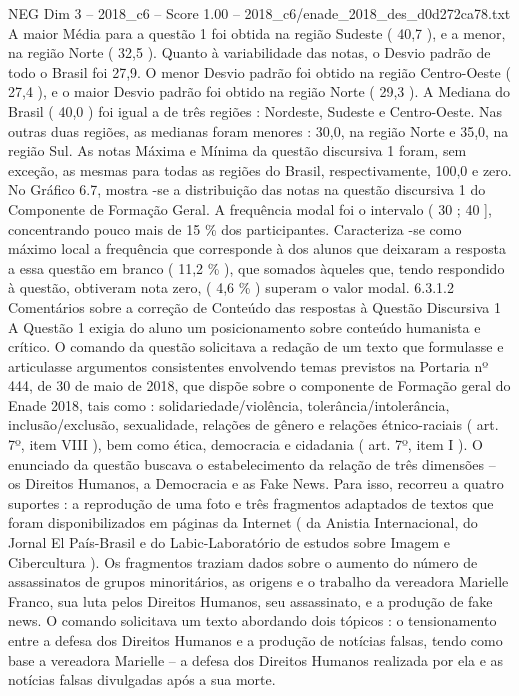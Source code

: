 \begin{textsample}{NEG Dim 3 – 2018\_c6 – Score 1.00 – 2018\_c6/enade\_2018\_des\_d0d272ca78.txt}
A maior Média para a questão 1 foi obtida na região Sudeste ( 40,7 ), e a menor, na região Norte ( 32,5 ).
Quanto à variabilidade das notas, o Desvio padrão de todo o Brasil foi 27,9.
O menor Desvio padrão foi obtido na região Centro-Oeste ( 27,4 ), e o maior Desvio padrão foi obtido na região Norte ( 29,3 ).
A Mediana do Brasil ( 40,0 ) foi igual a de três regiões : Nordeste, Sudeste e Centro-Oeste.
Nas outras duas regiões, as medianas foram menores : 30,0, na região Norte e 35,0, na região Sul.
As notas Máxima e Mínima da questão discursiva 1 foram, sem exceção, as mesmas para todas as regiões do Brasil, respectivamente, 100,0 e zero.
No Gráfico 6.7, mostra -se a distribuição das notas na questão discursiva 1 do Componente de Formação Geral.
A frequência modal foi o intervalo ( 30 ; 40 ], concentrando pouco mais de 15 \% dos participantes.
Caracteriza -se como máximo local a frequência que corresponde à dos alunos que deixaram a resposta a essa questão em branco ( 11,2 \% ), que somados àqueles que, tendo respondido à questão, obtiveram nota zero, ( 4,6 \% ) superam o valor modal. 6.3.1.2 Comentários sobre a correção de Conteúdo das respostas à Questão Discursiva 1 A Questão 1 exigia do aluno um posicionamento sobre conteúdo humanista e crítico.
O comando da questão solicitava a redação de um texto que formulasse e articulasse argumentos consistentes envolvendo temas previstos na Portaria nº 444, de 30 de maio de 2018, que dispõe sobre o componente de Formação geral do Enade 2018, tais como : solidariedade/violência, tolerância/intolerância, inclusão/exclusão, sexualidade, relações de gênero e relações étnico-raciais ( art. 7º, item VIII ), bem como ética, democracia e cidadania ( art. 7º, item I ).
O enunciado da questão buscava o estabelecimento da relação de três dimensões – os Direitos Humanos, a Democracia e as Fake News.
Para isso, recorreu a quatro suportes : a reprodução de uma foto e três fragmentos adaptados de textos que foram disponibilizados em páginas da Internet ( da Anistia Internacional, do Jornal El País-Brasil e do Labic-Laboratório de estudos sobre Imagem e Cibercultura ).
Os fragmentos traziam dados sobre o aumento do número de assassinatos de grupos minoritários, as origens e o trabalho da vereadora Marielle Franco, sua luta pelos Direitos Humanos, seu assassinato, e a produção de fake news.
O comando solicitava um texto abordando dois tópicos : o tensionamento entre a defesa dos Direitos Humanos e a produção de notícias falsas, tendo como base a vereadora Marielle – a defesa dos Direitos Humanos realizada por ela e as notícias falsas divulgadas após a sua morte.

\end{textsample}
